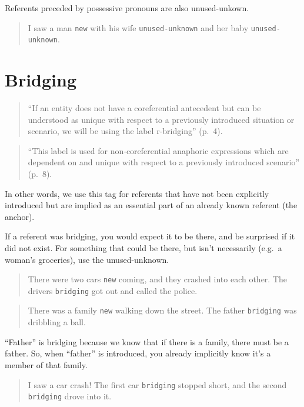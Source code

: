 \documentclass[
]{book}
\begin{document}
Referents preceded by possessive pronouns are also unused-unkown.

\begin{quote}
I saw a man \texttt{new} with his wife \texttt{unused-unknown} and her baby \texttt{unused-unknown}.
\end{quote}

\hypertarget{bridging}{%
\section{Bridging}\label{bridging}}

\begin{quote}
``If an entity does not have a coreferential antecedent but can be understood as unique with respect to a previously introduced situation or scenario, we will be using the label r-bridging'' (p.~4).
\end{quote}

\begin{quote}
``This label is used for non-coreferential anaphoric expressions which are dependent on and unique with respect to a previously introduced scenario'' (p.~8).
\end{quote}

In other words, we use this tag for referents that have not been explicitly introduced but are implied as an essential part of an already known referent (the anchor).

If a referent was bridging, you would expect it to be there, and be surprised if it did not exist.
For something that could be there, but isn't necessarily (e.g.~a woman's groceries), use the unused-unknown.

\begin{quote}
There were two cars \texttt{new} coming, and they crashed into each other.
The drivers \texttt{bridging} got out and called the police.
\end{quote}

\begin{quote}
There was a family \texttt{new} walking down the street.
The father \texttt{bridging} was dribbling a ball.
\end{quote}

``Father'' is bridging because we know that if there is a family, there must be a father.
So, when ``father'' is introduced, you already implicitly know it's a member of that family.

\begin{quote}
I saw a car crash! The first car \texttt{bridging} stopped short, and the second \texttt{bridging} drove into it.
\end{quote}
\end{document}
